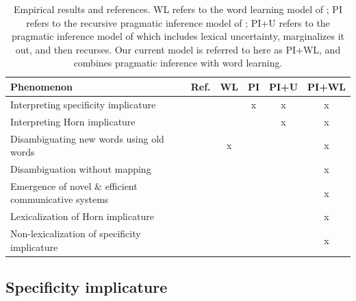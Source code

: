 \documentclass{article} %
\begin{document}
\begin{table}[t]
\label{tab:results}
\begin{center}
\begin{tabular}{lccccc}
\toprule
Phenomenon & Ref. & WL & PI & PI+U & PI+WL \\
\midrule
Interpreting specificity implicature & \cite{grice1975} &  & x &x & x\\
Interpreting Horn implicature & \cite{horn1984} & &  & x& x\\
Disambiguating new words using old words & \cite{markman1988} &x  & & & x \\
Disambiguation without mapping & \cite{horst2008} &  & & & x \\
Emergence of novel \& efficient communicative systems & \cite{galantucci2005} & & & & x \\
Lexicalization of Horn implicature & \cite{horn1984} & & & & x \\
Non-lexicalization of specificity implicature & \cite{levinson2000} & & & & x \\
\hline
\end{tabular}
\end{center}
\caption{Empirical results and references. WL refers to the word
  learning model of \cite{frank2009}; PI refers to the recursive
  pragmatic inference model of \cite{frank2012}; PI+U refers to the
  pragmatic inference model of \cite{bergen2012} which includes
  lexical uncertainty, marginalizes it out, and then recurses. Our
  current model is referred to here as PI+WL, and combines pragmatic
  inference with word learning.}
\end{table}



\subsection{Specificity implicature}

\label{sec:spec}
\end{document}
